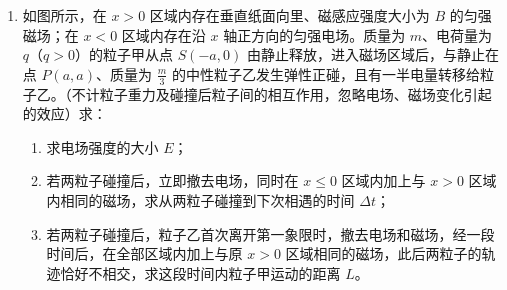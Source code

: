 \documentclass[\gkver]{gaokaozhenti}
\begin{document}
\begin{enumerate}
{\begin{enumerate}
	\item
	$\frac{133}{150}T_0$
\end{enumerate}
}

\item
如图所示，在 $x>0$ 区域内存在垂直纸面向里、磁感应强度大小为 $B$ 的匀强磁场；在 $x<0$ 区域内存在沿 $x$ 轴正方向的匀强电场。质量为 $m$、电荷量为 $q$（$q>0$）的粒子甲从点 $S(-a,0)$ 由静止释放，进入磁场区域后，与静止在点 $P(a,a)$、质量为 $\frac{m}{3}$ 的中性粒子乙发生弹性正碰，且有一半电量转移给粒子乙。（不计粒子重力及碰撞后粒子间的相互作用，忽略电场、磁场变化引起的效应）求：

\begin{enumerate}
	\item
	求电场强度的大小 $E$；
	\item
	若两粒子碰撞后，立即撤去电场，同时在 $x\leq0$ 区域内加上与 $x>0$ 区域内相同的磁场，求从两粒子碰撞到下次相遇的时间 $\Delta t$；
	\item
	若两粒子碰撞后，粒子乙首次离开第一象限时，撤去电场和磁场，经一段时间后，在全部区域内加上与原 $x>0$ 区域相同的磁场，此后两粒子的轨迹恰好不相交，求这段时间内粒子甲运动的距离 $L$。
\end{enumerate}


\end{enumerate}
\end{document}

